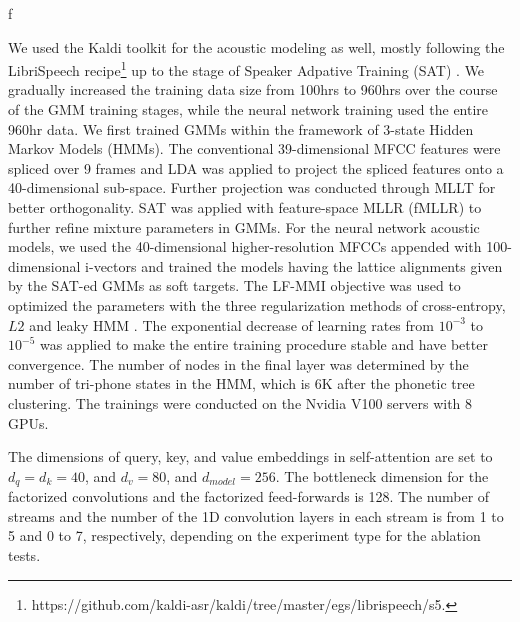 f\documentclass{article}
\begin{document}
We used the Kaldi toolkit for the acoustic modeling as well, mostly following the LibriSpeech recipe\footnote{https://github.com/kaldi-asr/kaldi/tree/master/egs/librispeech/s5.} up to the stage of Speaker Adpative Training (SAT) \cite{Gales97}. We gradually increased the training data size from 100hrs to 960hrs over the course of the GMM training stages, while the neural network training used the entire 960hr data. We first trained GMMs within the framework of 3-state Hidden Markov Models (HMMs). The conventional 39-dimensional MFCC features were spliced over 9 frames and LDA was applied to project the spliced features onto a 40-dimensional sub-space. Further projection was conducted through MLLT for better orthogonality. SAT was applied with feature-space MLLR (fMLLR) to further refine mixture parameters in GMMs. For the neural network acoustic models, we used the 40-dimensional higher-resolution MFCCs appended with 100-dimensional i-vectors \cite{Dehak11} and trained the models having the lattice alignments given by the SAT-ed GMMs as soft targets. The LF-MMI objective was used to optimized the parameters with the three regularization methods of cross-entropy, $L2$ and leaky HMM \cite{Povey16}. The exponential decrease of learning rates from $10^{-3}$ to $10^{-5}$ was applied to make the entire training procedure stable and have better convergence. The number of nodes in the final layer was determined by the number of tri-phone states in the HMM, which is 6K after the phonetic tree clustering.  The trainings were conducted on the Nvidia V100 servers with 8  GPUs.  

The dimensions of query, key,  and value embeddings in self-attention are set to $d_{q}=d_{k}=40$, and $d_{v}=80$, and $d_{model}=256$. The bottleneck dimension for the factorized convolutions and the factorized feed-forwards is 128. The number of streams and the number of the 1D convolution layers in each stream is from 1 to 5 and 0 to 7, respectively, depending on the experiment type for the ablation tests.
\end{document}
